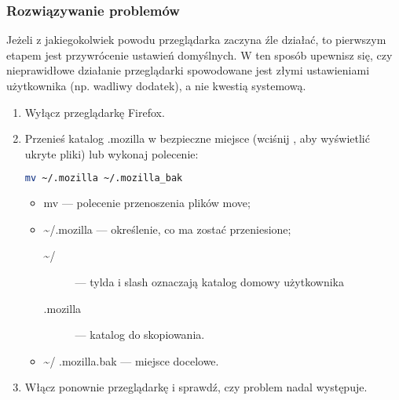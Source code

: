 \subsubsection{Rozwiązywanie problemów}
Jeżeli z jakiegokolwiek powodu przeglądarka zaczyna źle działać, to pierwszym etapem jest przywrócenie ustawień domyślnych. W ten sposób upewnisz się, czy nieprawidłowe działanie przeglądarki spowodowane jest złymi ustawieniami użytkownika (np. wadliwy dodatek), a nie kwestią systemową.
\begin{enumerate}
\item Wyłącz przeglądarkę Firefox.
\item Przenieś katalog .mozilla w bezpieczne miejsce (wciśnij , aby wyświetlić ukryte pliki) lub wykonaj polecenie:
\begin{lstlisting}[language=bash]
mv ~/.mozilla ~/.mozilla_bak
\end{lstlisting}
\begin{itemize}
\item \textcolor{ubuntu_orange}{mv} --- polecenie przenoszenia plików move;
\item \textcolor{ubuntu_orange}{\textasciitilde /.mozilla} --- określenie, co ma zostać przeniesione;
	\begin{description}
	\item[\textasciitilde /] --- tylda i slash oznaczają katalog domowy użytkownika
	\item[.mozilla] --- katalog do skopiowania.
	\end{description}
\item \textasciitilde / .mozilla.bak --- miejsce docelowe.
\end{itemize}
\item Włącz ponownie przeglądarkę i sprawdź, czy problem nadal występuje.
\end{enumerate}
